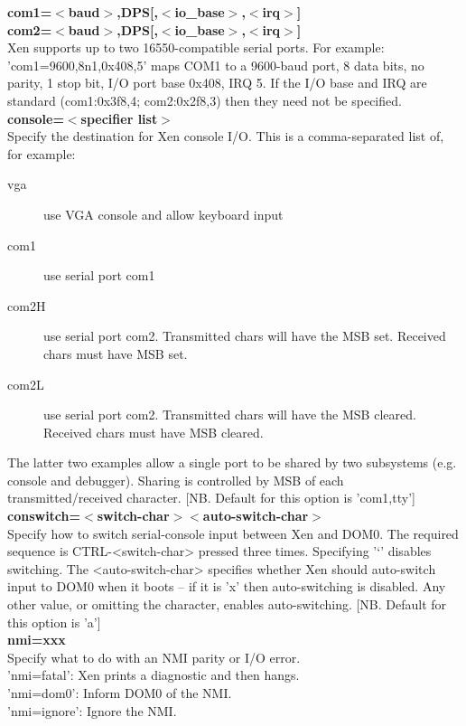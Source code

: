 \documentclass[11pt,twoside,final,openright]{xenstyle}
\begin{document}
{{\bf com1=$<$baud$>$,DPS[,$<$io\_base$>$,$<$irq$>$] \\
 com2=$<$baud$>$,DPS[,$<$io\_base$>$,$<$irq$>$] } \\
 Xen supports up to two 16550-compatible serial ports.
 For example: 'com1=9600,8n1,0x408,5' maps COM1 to a
 9600-baud port, 8 data bits, no parity, 1 stop bit,
 I/O port base 0x408, IRQ 5.
 If the I/O base and IRQ are standard (com1:0x3f8,4;
 com2:0x2f8,3) then they need not be specified. \\

{\bf console=$<$specifier list$>$ } \\
 Specify the destination for Xen console I/O.
 This is a comma-separated list of, for example:
\begin{description}
 \item[vga]  use VGA console and allow keyboard input
 \item[com1] use serial port com1
 \item[com2H] use serial port com2. Transmitted chars will
   have the MSB set. Received chars must have
   MSB set.
 \item[com2L] use serial port com2. Transmitted chars will
   have the MSB cleared. Received chars must
   have MSB cleared.
\end{description}
 The latter two examples allow a single port to be
 shared by two subsystems (e.g. console and
 debugger). Sharing is controlled by MSB of each
 transmitted/received character.
 [NB. Default for this option is 'com1,tty'] \\

{\bf conswitch=$<$switch-char$><$auto-switch-char$>$ } \\
 Specify how to switch serial-console input between
 Xen and DOM0. The required sequence is CTRL-<switch-char>
 pressed three times. Specifying '`' disables switching.
 The <auto-switch-char> specifies whether Xen should
 auto-switch input to DOM0 when it boots -- if it is 'x'
 then auto-switching is disabled. Any other value, or
 omitting the character, enables auto-switching.
 [NB. Default for this option is 'a'] \\

{\bf nmi=xxx } \\
 Specify what to do with an NMI parity or I/O error. \\
 'nmi=fatal':  Xen prints a diagnostic and then hangs. \\
 'nmi=dom0':   Inform DOM0 of the NMI. \\
 'nmi=ignore': Ignore the NMI. \\

}
\end{document}
